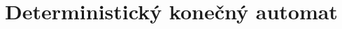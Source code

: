 \documentclass [11pt, a4paper]{article}
\begin{document}
\section{Deterministický konečný automat}
\end{document}
